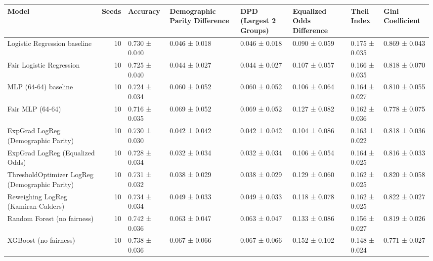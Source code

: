\begin{tabular}{lrllllll}
\toprule
Model & Seeds & Accuracy & Demographic Parity Difference & DPD (Largest 2 Groups) & Equalized Odds Difference & Theil Index & Gini Coefficient \\
\midrule
Logistic Regression baseline & 10 & 0.730 ± 0.040 & 0.046 ± 0.018 & 0.046 ± 0.018 & 0.090 ± 0.059 & 0.175 ± 0.035 & 0.869 ± 0.043 \\
Fair Logistic Regression & 10 & 0.725 ± 0.040 & 0.044 ± 0.027 & 0.044 ± 0.027 & 0.107 ± 0.057 & 0.166 ± 0.035 & 0.818 ± 0.070 \\
MLP (64-64) baseline & 10 & 0.724 ± 0.034 & 0.060 ± 0.052 & 0.060 ± 0.052 & 0.106 ± 0.064 & 0.164 ± 0.027 & 0.810 ± 0.055 \\
Fair MLP (64-64) & 10 & 0.716 ± 0.035 & 0.069 ± 0.052 & 0.069 ± 0.052 & 0.127 ± 0.082 & 0.162 ± 0.036 & 0.778 ± 0.075 \\
ExpGrad LogReg (Demographic Parity) & 10 & 0.730 ± 0.030 & 0.042 ± 0.042 & 0.042 ± 0.042 & 0.104 ± 0.086 & 0.163 ± 0.022 & 0.818 ± 0.036 \\
ExpGrad LogReg (Equalized Odds) & 10 & 0.728 ± 0.034 & 0.032 ± 0.034 & 0.032 ± 0.034 & 0.106 ± 0.054 & 0.164 ± 0.025 & 0.816 ± 0.033 \\
ThresholdOptimizer LogReg (Demographic Parity) & 10 & 0.731 ± 0.032 & 0.038 ± 0.029 & 0.038 ± 0.029 & 0.129 ± 0.060 & 0.162 ± 0.025 & 0.820 ± 0.058 \\
Reweighing LogReg (Kamiran-Calders) & 10 & 0.734 ± 0.034 & 0.049 ± 0.033 & 0.049 ± 0.033 & 0.118 ± 0.078 & 0.162 ± 0.025 & 0.822 ± 0.027 \\
Random Forest (no fairness) & 10 & 0.742 ± 0.036 & 0.063 ± 0.047 & 0.063 ± 0.047 & 0.133 ± 0.086 & 0.156 ± 0.027 & 0.819 ± 0.026 \\
XGBoost (no fairness) & 10 & 0.738 ± 0.036 & 0.067 ± 0.066 & 0.067 ± 0.066 & 0.152 ± 0.102 & 0.148 ± 0.024 & 0.771 ± 0.027 \\
\bottomrule
\end{tabular}
